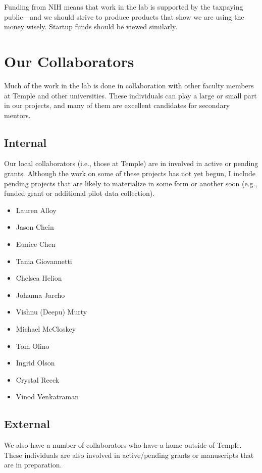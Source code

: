 \documentclass[letterpaper,11pt,oneside]{memoir}
\begin{document}
Funding from NIH means that work in the lab is supported by the taxpaying public---and we should strive to produce products that show we are using the money wisely. Startup funds should be viewed similarly. 


\section{Our Collaborators}

Much of the work in the lab is done in collaboration with other faculty members at Temple and other universities. These individuals can play a large or small part in our projects, and many of them are excellent candidates for secondary mentors. 

\subsection{Internal}

Our local collaborators (i.e., those at Temple) are in involved in active or pending grants. Although the work on some of these projects has not yet begun, I include pending projects that are likely to materialize in some form or another soon (e.g., funded grant or additional pilot data collection).

\begin{multicols}{2}
\begin{itemize}[noitemsep,nolistsep]
\item Lauren Alloy
\item Jason Chein
\item Eunice Chen
\item Tania Giovannetti
\item Chelsea Helion
\item Johanna Jarcho
\item Vishnu (Deepu) Murty
\item Michael McCloskey
\item Tom Olino
\item Ingrid Olson
\item Crystal Reeck
\item Vinod Venkatraman
\end{itemize}
\end{multicols}

\subsection{External}

We also have a number of collaborators who have a home outside of Temple. These individuals are also involved in active/pending grants or manuscripts that are in preparation. \\
\end{document}
